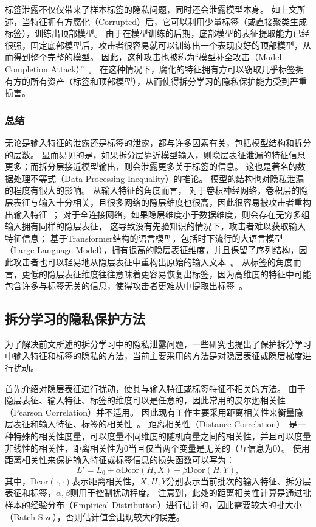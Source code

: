 标签泄露不仅仅带来了样本标签的隐私问题，同时还会泄露模型本身。
%
如上文所述，当特征拥有方腐化（Corrupted）后，它可以利用少量标签（或直接聚类生成标签），训练出顶部模型。
%
由于在模型训练的后期，底部模型的表征提取能力已经很强，固定底部模型后，攻击者很容易就可以训练出一个表现良好的顶部模型，从而得到整个完整的模型。
%
因此，这种攻击也被称为“模型补全攻击（Model Completion Attack）”~\cite{fucong2022label_infer_attack}。
%
在这种情况下，腐化的特征拥有方可以窃取几乎标签拥有方的所有资产（标签和顶部模型），从而使得拆分学习的隐私保护能力受到严重损害。


\subsubsection{总结}
%
无论是输入特征的泄露还是标签的泄露，都与许多因素有关，包括模型结构和拆分的层数。
%
显而易见的是，如果拆分层靠近模型输入，则隐层表征泄漏的特征信息更多；而拆分层接近模型输出，则会泄露更多关于标签的信息。
%
这也是著名的数据处理不等式（Data Processing Inequality）的推论。
%
模型的结构也对隐私泄漏的程度有很大的影响。
%
从输入特征的角度而言，
%
对于卷积神经网络，卷积层的隐层表征与输入十分相关，且很多网络的隐层维度也很高，因此很容易被攻击者重构出输入特征~\cite{abuadbba2020can_split}；
%
对于全连接网络，如果隐层维度小于数据维度，则会存在无穷多组输入拥有同样的隐层表征，
这导致没有先验知识的情况下，攻击者难以获取输入特征信息；
%
基于Transformer结构的语言模型，包括时下流行的大语言模型（Large Language Model），拥有很高的隐层表征维度，并且保留了序列结构，因此攻击者也可以轻易地从隐层表征中重构出原始的输入文本~\cite{morris2023embedding_almost}。
%
从标签的角度而言，更低的隐层表征维度往往意味着更容易恢复出标签，因为高维度的特征中可能包含许多与标签无关的信息，使得攻击者更难从中提取出标签~\cite{oscarli2022label_defense_marvell,sunjiankai2022forward_embedding_protect}。


\subsection{拆分学习的隐私保护方法}
为了解决前文所述的拆分学习中的隐私泄露问题，一些研究也提出了保护拆分学习中输入特征和标签的隐私的方法，当前主要采用的方法是对隐层表征或隐层梯度进行扰动。

首先介绍对隐层表征进行扰动，使其与输入特征或标签特征不相关的方法。
%
由于隐层表征、输入特征、标签的维度可以是任意的，因此常用的皮尔逊相关性（Pearson Correlation）并不适用。
%
因此现有工作主要采用距离相关性来衡量隐层表征和输入特征、标签的相关性~\cite{vepakomma2020nopeek,sunjiankai2022forward_embedding_protect}。
%
距离相关性（Distance Correlation）~\cite{szekely2007dcor,szekely2009brownian_dcor}是一种特殊的相关性度量，可以度量不同维度的随机向量之间的相关性，并且可以度量非线性的相关性，距离相关性为0当且仅当两个变量是无关的（互信息为0）。
%
使用距离相关性来保护输入特征或标签信息的损失函数可以写为：
\begin{equation}
    L' = L_0 + \alpha \text{Dcor}(H, X) + \beta \text{Dcor}(H, Y),
\end{equation}
其中，$\text{Dcor}(\cdot, \cdot)$表示距离相关性，$X,H,Y$分别表示当前批次的输入特征、拆分层表征和标签，$\alpha,\beta$则用于控制扰动程度。
%
注意到，此处的距离相关性计算是通过批样本的经验分布（Empirical Distribution）进行估计的，因此需要较大的批大小（Batch Size），否则估计值会出现较大的误差。
%

